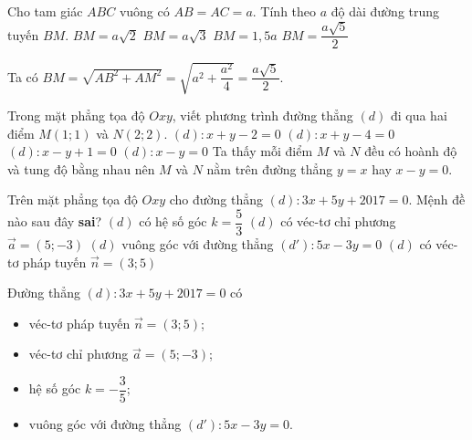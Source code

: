 \begin{ex}%
 Cho tam giác $ABC$ vuông có $AB = AC = a$. Tính theo $a$ độ dài đường trung tuyến $BM$.
 \choice
  {$BM = a\sqrt{2}$}
  {$BM = a\sqrt{3}$}
  {$BM = 1{,}5a$}
  {\True $BM = \dfrac{a\sqrt{5}}{2}$}
 \loigiai
 {
 \immini
 {
 Ta có $BM = \sqrt{AB^2 + AM^2} = \sqrt{a^2 + \dfrac{a^2}{4}} = \dfrac{a\sqrt{5}}{2}$.	
 }
 {
 }
 }
\end{ex}


\begin{ex}%
 Trong mặt phẳng tọa độ $Oxy$, viết phương trình đường thẳng $(d)$ đi qua hai điểm $M(1;1)$ và $N(2;2)$.
 \choice
  {$(d): x+y-2=0$}
  {$(d): x+y-4=0$}
  {$(d): x-y+1=0$}
  {\True $(d): x-y=0$}
 \loigiai
 {
 Ta thấy mỗi điểm $M$ và $N$ đều có hoành độ và tung độ bằng nhau nên $M$ và $N$ nằm trên đường thẳng $y = x$ hay $x - y = 0$.
 }
\end{ex}


\begin{ex}%
 Trên mặt phẳng tọa độ $Oxy$ cho đường thẳng $(d): 3x + 5y + 2017 = 0$. Mệnh đề nào sau đây \textbf{sai}?
 \choice
  {\True $(d)$ có hệ số góc $k = \dfrac{5}{3}$}
  {$(d)$ có véc-tơ chỉ phương $\vec{a} = (5;-3)$}
  {$(d)$ vuông góc với đường thẳng $(d'): 5x - 3y = 0$}
  {$(d)$ có véc-tơ pháp tuyến $\vec{n} = (3;5)$}
 \loigiai
 {
 Đường thẳng $(d): 3x + 5y + 2017 = 0$ có
 \begin{itemize}
  \item véc-tơ pháp tuyến $\vec{n} = (3;5)$;
  \item véc-tơ chỉ phương $\vec{a} = (5; -3)$;
  \item hệ số góc $k = -\dfrac{3}{5}$;
  \item vuông góc với đường thẳng $(d'): 5x - 3y = 0$.
 \end{itemize}
 }
\end{ex}


